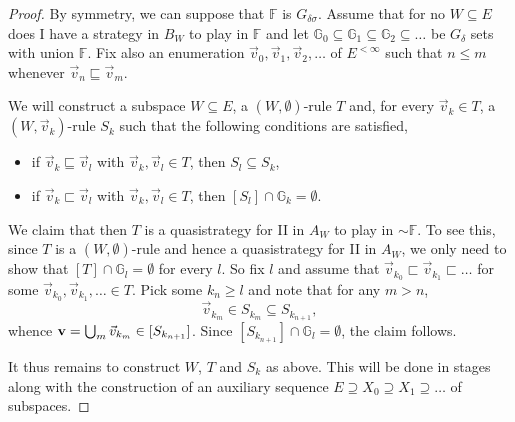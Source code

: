 \documentclass[10pt]{amsart}
\newcommand {\F}{\mathbb F}
\newcommand{\G}{\mathbb G}
\newcommand{\tom} {\emptyset}
\theoremstyle{definition}
\begin{document}
\begin{proof}By symmetry, we can suppose that $\F$ is $G_{\delta\sigma}$.
Assume that for no $W\subseteq E$ does I have a strategy in $B_W$ to play in $\F$ and let $\G_0\subseteq \G_1\subseteq \G_2\subseteq \ldots$ be $G_\delta$ sets with union $\F$. Fix also an enumeration $\vec v_0,\vec v_1,\vec v_2,\ldots$ of $E^{<\infty}$ such that $n\leqslant m$ whenever $\vec v_n\sqsubseteq \vec v_m$. 



We will construct a subspace $W\subseteq E$, a $(W,\tom)$-rule $T$ and, for every $\vec v_k\in T$, a $(W,\vec v_k)$-rule $S_k$ such that the following conditions are satisfied, 
\begin{itemize}
\item[(i)] if $\vec v_k\sqsubseteq \vec v_l$ with $\vec v_k,\vec v_l\in T$, then $S_l\subseteq S_k$, 
\item[(ii)] if $\vec v_k\sqsubset \vec v_l$ with $\vec v_k,\vec v_l\in T$, then $[S_l]\cap \G_k=\tom$.
\end{itemize}
We claim that then $T$ is a quasistrategy for II in $A_W$ to play in $\sim \F$. To see this, since $T$ is a $(W,\tom)$-rule and hence a quasistrategy for II in $A_W$, we only need to show that $[T]\cap \G_l=\tom$ for every $l$. So fix $l$ and assume that $\vec v_{k_0}\sqsubset \vec v_{k_1}\sqsubset \ldots$ for some $\vec v_{k_0}, \vec v_{k_1},\ldots \in T$. Pick some $k_n\geqslant l$ and note that for any $m>n$,
$$
\vec v_{k_m}\in S_{k_m}\subseteq S_{k_{n+1}},
$$
whence ${\bf v}=\bigcup_m\vec v_{k_m}\in [S_{k_{n+1}}]$. Since $ [S_{k_{n+1}}]\cap \G_l=\tom$, the claim follows.


It thus remains to construct $W$, $T$ and $S_k$ as above. This will be done in stages along with the construction of an auxiliary sequence $E\supseteq X_0\supseteq X_1\supseteq \ldots$ of subspaces.




\end{proof}
\end{document}
